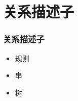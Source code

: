 \documentclass{beamer}
\begin{document}
\section{关系描述子}
\label{sec-5}
\begin{frame}
\frametitle{关系描述子}
\label{sec-5-1}

\begin{itemize}
\item 规则
\item 串
\item 树
\end{itemize}
\end{frame}
\end{document}
